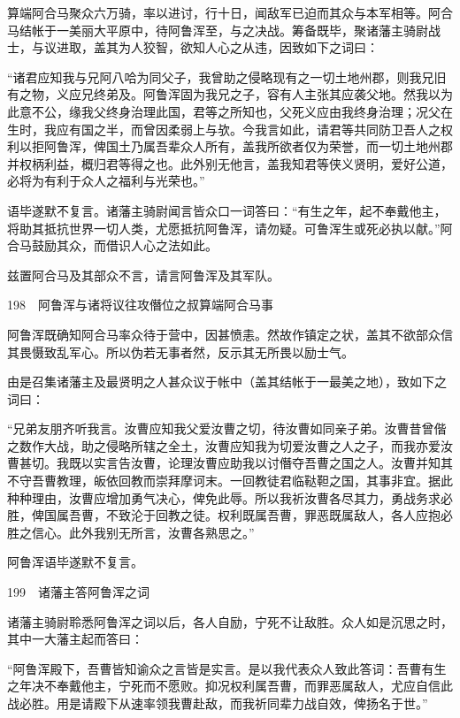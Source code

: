 \documentclass[12pt,UTF8]{ctexbook}
\begin{document}
算端阿合马聚众六万骑，率以进讨，行十日，闻敌军已迫而其众与本军相等。阿合马结帐于一美丽大平原中，待阿鲁浑至，与之决战。筹备既毕，聚诸藩主骑尉战士，与议进取，盖其为人狡智，欲知人心之从违，因致如下之词曰：

“诸君应知我与兄阿八哈为同父子，我曾助之侵略现有之一切土地州郡，则我兄旧有之物，义应兄终弟及。阿鲁浑固为我兄之子，容有人主张其应袭父地。然我以为此意不公，缘我父终身治理此国，君等之所知也，父死义应由我终身治理；况父在生时，我应有国之半，而曾因柔弱上与欤。今我言如此，请君等共同防卫吾人之权利以拒阿鲁浑，俾国土乃属吾辈众人所有，盖我所欲者仅为荣誉，而一切土地州郡并权柄利益，概归君等得之也。此外别无他言，盖我知君等侠义贤明，爱好公道，必将为有利于众人之福利与光荣也。”

语毕遂默不复言。诸藩主骑尉闻言皆众口一词答曰：“有生之年，起不奉戴他主，将助其抵抗世界一切人类，尤愿抵抗阿鲁浑，请勿疑。可鲁浑生或死必执以献。”阿合马鼓励其众，而借识人心之法如此。

兹置阿合马及其部众不言，请言阿鲁浑及其军队。





198　阿鲁浑与诸将议往攻僭位之叔算端阿合马事

阿鲁浑既确知阿合马率众待于营中，因甚愤恚。然故作镇定之状，盖其不欲部众信其畏慑致乱军心。所以伪若无事者然，反示其无所畏以励士气。

由是召集诸藩主及最贤明之人甚众议于帐中（盖其结帐于一最美之地），致如下之词曰：

“兄弟友朋齐听我言。汝曹应知我父爱汝曹之切，待汝曹如同亲子弟。汝曹昔曾偕之数作大战，助之侵略所辖之全土，汝曹应知我为切爱汝曹之人之子，而我亦爱汝曹甚切。我既以实言告汝曹，论理汝曹应助我以讨僭夺吾曹之国之人。汝曹并知其不守吾曹教理，皈依回教而崇拜摩诃末。一回教徒君临鞑靼之国，其事非宜。据此种种理由，汝曹应增加勇气决心，俾免此辱。所以我祈汝曹各尽其力，勇战务求必胜，俾国属吾曹，不致沦于回教之徒。权利既属吾曹，罪恶既属敌人，各人应抱必胜之信心。此外我别无所言，汝曹各熟思之。”

阿鲁浑语毕遂默不复言。





199　诸藩主答阿鲁浑之词

诸藩主骑尉聆悉阿鲁浑之词以后，各人自励，宁死不让敌胜。众人如是沉思之时，其中一大藩主起而答曰：

“阿鲁浑殿下，吾曹皆知谕众之言皆是实言。是以我代表众人致此答词：吾曹有生之年决不奉戴他主，宁死而不愿败。抑况权利属吾曹，而罪恶属敌人，尤应自信此战必胜。用是请殿下从速率领我曹赴敌，而我祈同辈力战自效，俾扬名于世。”
\end{document}
